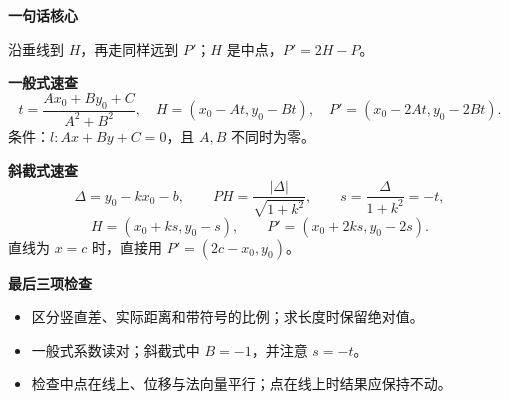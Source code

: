 \begin{minipage}{\linewidth}
\begin{summarybox}
\textbf{\textcolor{CSummary}{一句话核心}}

沿垂线到 $H$，再走同样远到 $P'$；$H$ 是中点，$P'=2H-P$。

\medskip
\textbf{\textcolor{CSummary}{一般式速查}}
\[
 t=\frac{Ax_0+By_0+C}{A^2+B^2},\quad
 H=(x_0-At,y_0-Bt),\quad
 P'=(x_0-2At,y_0-2Bt).
\]
条件：$l:Ax+By+C=0$，且 $A,B$ 不同时为零。

\medskip
\textbf{\textcolor{CSummary}{斜截式速查}}
\[
 \Delta=y_0-kx_0-b,\qquad
 PH=\frac{|\Delta|}{\sqrt{1+k^2}},\qquad s=\frac{\Delta}{1+k^2}=-t,
\]
\[
 H=(x_0+ks,y_0-s),\qquad P'=(x_0+2ks,y_0-2s).
\]
直线为 $x=c$ 时，直接用 $P'=(2c-x_0,y_0)$。

\medskip
\textbf{\textcolor{CSummary}{最后三项检查}}
\begin{itemize}[leftmargin=*,itemsep=.4em]
\item 区分竖直差、实际距离和带符号的比例；求长度时保留绝对值。
\item 一般式系数读对；斜截式中 $B=-1$，并注意 $s=-t$。
\item 检查中点在线上、位移与法向量平行；点在线上时结果应保持不动。
\end{itemize}
\end{summarybox}
\end{minipage}
